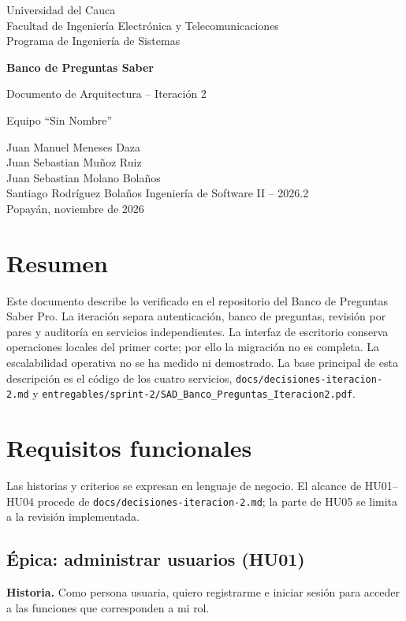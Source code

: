 \documentclass[12pt,a4paper]{article}
\begin{document}
\begin{titlepage}
\centering
{\Large Universidad del Cauca\\Facultad de Ingeniería Electrónica y Telecomunicaciones\\Programa de Ingeniería de Sistemas\par}
\vspace{2cm}
{\huge\bfseries Banco de Preguntas Saber\par}
\vspace{0.5cm}
{\Large Documento de Arquitectura -- Iteración 2\par}
\vspace{1cm}
{Equipo ``Sin Nombre''\par}
\vspace{0.4cm}
Juan Manuel Meneses Daza\\Juan Sebastian Muñoz Ruiz\\Juan Sebastian Molano Bolaños\\Santiago Rodríguez Bolaños
\vfill
Ingeniería de Software II -- 2026.2\\Popayán, noviembre de 2026
\end{titlepage}
\tableofcontents\newpage

\section{Resumen}
Este documento describe lo verificado en el repositorio del Banco de Preguntas Saber Pro. La iteración separa autenticación, banco de preguntas, revisión por pares y auditoría en servicios independientes. La interfaz de escritorio conserva operaciones locales del primer corte; por ello la migración no es completa. La escalabilidad operativa no se ha medido ni demostrado. La base principal de esta descripción es el código de los cuatro servicios, \texttt{docs/decisiones-iteracion-2.md} y \texttt{entregables/sprint-2/SAD\_Banco\_Preguntas\_Iteracion2.pdf}.

\section{Requisitos funcionales}
Las historias y criterios se expresan en lenguaje de negocio. El alcance de HU01--HU04 procede de \texttt{docs/decisiones-iteracion-2.md}; la parte de HU05 se limita a la revisión implementada.

\subsection{Épica: administrar usuarios (HU01)}
\textbf{Historia.} Como persona usuaria, quiero registrarme e iniciar sesión para acceder a las funciones que corresponden a mi rol.
\end{document}
